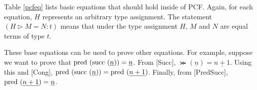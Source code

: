 Table \ref{pcfeq} lists basic equations that should hold inside of PCF.  Again, for each equation, $H$ represents an arbitrary type assignment.  The statement $(H \triangleright M = N : t)$ means that under the type assignment $H$, $M$ and $N$ are equal terms of type $t$.  

These base equations can be used to prove other equations.  For example, suppose we want to prove that $\textrm{pred }(\textrm{succ }(\underline{n})) = \underline{n}$.  From [Succ], $\Succ(\underline{n}) = \underline{n+1}$.  Using this and [Cong], $\textrm{pred }(\textrm{succ }(\underline{n})) = \textrm{pred }(\underline{n+1})$.  Finally, from [PredSucc], $\textrm{pred }(\underline{n+1}) = \underline{n}$.

\begin{table} 
\begin{center}
\caption{Typing Rules For PCF} \label{pcftypes}
\end{center}
\end{table}

